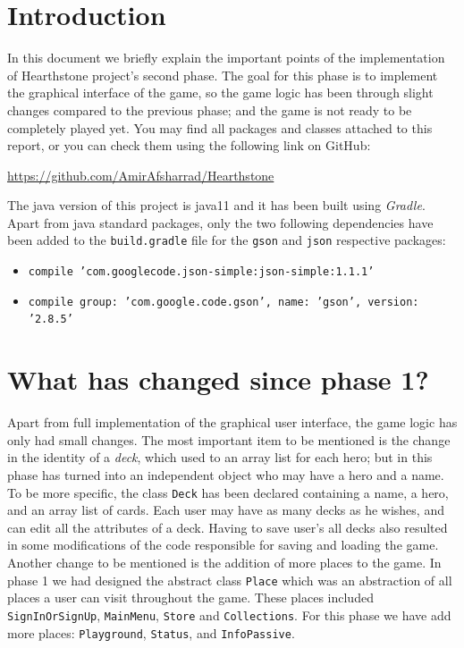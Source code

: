 \documentclass[a4paper]{article}
\begin{document}
\large
\tableofcontents
\clearpage
\section{Introduction}
In this document we briefly explain the important points of the implementation of Hearthstone project's second phase. The goal for this phase is to implement the graphical interface of the game, so the game logic has been through slight changes compared to the previous phase; and the game is not ready to be completely played yet. You may find all packages and classes attached to this report, or you can check them using the following link on GitHub:
\begin{center}
	\url{https://github.com/AmirAfsharrad/Hearthstone}
\end{center}
The java version of this project is java11 and it has been built using \textit{Gradle}. Apart from java standard packages, only the two following dependencies have been added to the \texttt{build.gradle} file for the \texttt{gson} and \texttt{json} respective packages:
\begin{itemize}
	\item \texttt{compile 'com.googlecode.json-simple:json-simple:1.1.1'}
	\item \texttt{compile group: 'com.google.code.gson', name: 'gson', version: '2.8.5'}
\end{itemize}

\clearpage
\section{What has changed since phase 1?}
Apart from full implementation of the graphical user interface, the game logic has only had small changes. The most important item to be mentioned is the change in the identity of a \textit{deck}, which used to an array list for each hero; but in this phase has turned into an independent object who may have a hero and a name. To be more specific, the class \texttt{Deck} has been declared containing a name, a hero, and an array list of cards. Each user may have as many decks as he wishes, and can edit all the attributes of a deck. Having to save user's all decks also resulted in some modifications of the code responsible for saving and loading the game.\\

Another change to be mentioned is the addition of more places to the game. In phase 1 we had designed the abstract class \texttt{Place} which was an abstraction of all places a user can visit throughout the game. These places included \texttt{SignInOrSignUp}, \texttt{MainMenu}, \texttt{Store} and \texttt{Collections}. For this phase we have add more places: \texttt{Playground}, \texttt{Status}, and \texttt{InfoPassive}.\\
\end{document}
